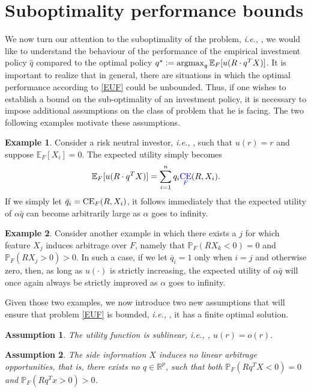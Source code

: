 \documentclass[]{interact}
\theoremstyle{plain}%
\theoremstyle{definition}
\theoremstyle{remark}
\def\Expect{{\mathbb E}}
\def\Prob{{\mathbb P}}
\def\argmax{\mathop{\rm argmax}}
\newcommand{\ie}{{\it i.e., }}
\newcommand{\0}{\V{0}}
\newcommand{\1}{\V{1}}
\renewcommand{\Re}{\mathbb{R}}
\newcommand{\EDmodified}[1]{{\color{red} #1}}
\newcommand{\EDcomments}[1]{{\EDmodified{Erick commented: #1}}}
\newcommand{\modified}[1]{{\color{blue} #1}}
\def\Cov{\mathop{\rm CE}}
\theoremstyle{plain}
\newtheorem{assumption}{Assumption}
\theoremstyle{definition}
\newtheorem*{ex}{Example}
\begin{document}
%
\section{Suboptimality performance bounds}\label{sec:sub}

We now turn our attention to the suboptimality of the problem, \ie, we would like to
understand the behaviour of the performance of the empirical investment policy $\hat q$
compared to the optimal policy $q^\star := \argmax_q \Expect_F[u(R\cdot q^T X)]$. It is
important to realize that in general, there are situations in which the optimal
performance according to \eqref{EUF} could be unbounded. Thus, if one wishes to establish
a bound on the sub-optimality of an investment policy, it is necessary to impose
additional assumptions on the class of problem that he is facing. The two following
examples motivate these assumptions.

\begin{ex}
  Consider a risk neutral investor, \ie, such that $u(r)=r$ and suppose
  $\Expect_F[ X_i]=0$. The expected utility simply becomes
  \[
    \Expect_F[u(R\cdot q^T X)] = \sum_{i=1}^{n}q_i\modified{\Cov_F}(R,X_i).
  \]
  If we simply let $\bar q_i = \Cov_F(R,X_i)$, it follows immediately that the expected
  utility of $\alpha \bar q$ can become arbitrarily large as $\alpha$ goes to infinity.
\end{ex}

\begin{ex}
  Consider another example in which there \modified{exists} a $j$ for which feature $X_j$ induces
  arbitrage over $F$, namely that $\Prob_F(RX_k<0)=0$ and $\Prob_F(RX_j>0)  >  0$. In such a case, if we let
  $\bar q_i = 1$ only when $i=j$ and otherwise zero, then, as long as $u(\cdot)$ is strictly increasing, the expected utility of
  $\alpha\bar q$ will once again always be strictly improved as $\alpha$ goes to   infinity.
\end{ex}

Given those two examples, we now introduce two new assumptions that will ensure that
problem \eqref{EUF} is bounded, \ie, it has a finite optimal solution.

\begin{assumption}\label{ass:usublinear}
  The utility function is sublinear, \ie, $u(r) = o(r)$. 
\end{assumption}

\begin{assumption}\label{ass:arbitrage}
  The side information $X$ induces no linear arbitrage opportunities, that is, there exists no $q\in\Re^p$, such that both
  $\Prob_F(R q^T X < 0) = 0$ and $\Prob_F(R q^T x > 0) > 0$.
\end{assumption}
\end{document}
